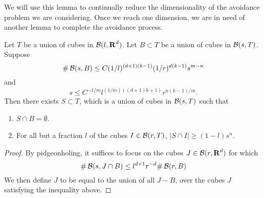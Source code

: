 We will use this lemma to continually reduce the dimensionality of the avoidance problem we are considering. Once we reach one dimension, we are in need of another lemma to complete the avoidance process.

\begin{lemma}
    Let $T$ be a union of cubes in $\operatorname{\mathcal{B}}(l,\operatorname{\mathbf{R}}^d)$. Let $B \subset T$ be a union of cubes in $\operatorname{\mathcal{B}}(s,T)$. Suppose
    \[ \# \operatorname{\mathcal{B}}(s,B) \leq C (1/l)^{(d+1)(k-1)} (1/r)^{d(k-1)} s^{m-n} \]
    and
    \[ s \leq C^{-1/m} l^{(1/m)((d+1)k + 1)} r^{n(k-1)/m}. \]
    Then there exists $S \subset T$, which is a union of cubes in $\operatorname{\mathcal{B}}(s,T)$ such that
    \begin{enumerate}
        \item $S \cap B = \emptyset$.
        \item For all but a fraction $l$ of the cubes $I \in \operatorname{\mathcal{B}}(r,T)$, $|S \cap I| \geq (1 - l) s^n$.
    \end{enumerate}
\end{lemma}
\begin{proof}
    By pidgeonholing, it suffices to focus on the cubes $J \in \operatorname{\mathcal{B}}(r,\operatorname{\mathbf{R}}^d)$ for which
    \[ \# \operatorname{\mathcal{B}}(s,J \cap B) \leq l^{d+1} r^{-d} \# \operatorname{\mathcal{B}}(r,B) \]
    We then define $J$ to be equal to the union of all $J - B$, over the cubes $J$ satisfying the inequality above.
\end{proof}

\endinput